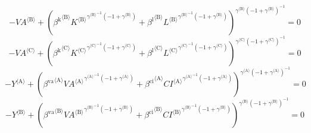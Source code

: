 \begin{equation}
-{{V\!A}}^{\langle \mathrm{B}\rangle} + \left({{\beta^{\mathrm{k}}}^{\langle \mathrm{\mathrm{B}}\rangle}} {{{K}^{\langle \mathrm{B}\rangle}}^{{{\gamma}^{\langle \mathrm{\mathrm{B}}\rangle}}^{-1} \left(-1 + {\gamma}^{\langle \mathrm{\mathrm{B}}\rangle}\right)}} + {{\beta^{\mathrm{l}}}^{\langle \mathrm{\mathrm{B}}\rangle}} {{{L}^{\langle \mathrm{B}\rangle}}^{{{\gamma}^{\langle \mathrm{\mathrm{B}}\rangle}}^{-1} \left(-1 + {\gamma}^{\langle \mathrm{\mathrm{B}}\rangle}\right)}}\right)^{{{\gamma}^{\langle \mathrm{\mathrm{B}}\rangle}} \left(-1 + {\gamma}^{\langle \mathrm{\mathrm{B}}\rangle}\right)^{-1}} = 0
\end{equation}
\begin{equation}
-{{V\!A}}^{\langle \mathrm{C}\rangle} + \left({{\beta^{\mathrm{k}}}^{\langle \mathrm{\mathrm{C}}\rangle}} {{{K}^{\langle \mathrm{C}\rangle}}^{{{\gamma}^{\langle \mathrm{\mathrm{C}}\rangle}}^{-1} \left(-1 + {\gamma}^{\langle \mathrm{\mathrm{C}}\rangle}\right)}} + {{\beta^{\mathrm{l}}}^{\langle \mathrm{\mathrm{C}}\rangle}} {{{L}^{\langle \mathrm{C}\rangle}}^{{{\gamma}^{\langle \mathrm{\mathrm{C}}\rangle}}^{-1} \left(-1 + {\gamma}^{\langle \mathrm{\mathrm{C}}\rangle}\right)}}\right)^{{{\gamma}^{\langle \mathrm{\mathrm{C}}\rangle}} \left(-1 + {\gamma}^{\langle \mathrm{\mathrm{C}}\rangle}\right)^{-1}} = 0
\end{equation}
\begin{equation}
-{Y}^{\langle \mathrm{A}\rangle} + \left({{\beta^{\mathrm{va}}}^{\langle \mathrm{\mathrm{A}}\rangle}} {{{{V\!A}}^{\langle \mathrm{A}\rangle}}^{{{\gamma}^{\langle \mathrm{\mathrm{A}}\rangle}}^{-1} \left(-1 + {\gamma}^{\langle \mathrm{\mathrm{A}}\rangle}\right)}} + {{\beta^{\mathrm{ci}}}^{\langle \mathrm{\mathrm{A}}\rangle}} {{{{C\!I}}^{\langle \mathrm{A}\rangle}}^{{{\gamma}^{\langle \mathrm{\mathrm{A}}\rangle}}^{-1} \left(-1 + {\gamma}^{\langle \mathrm{\mathrm{A}}\rangle}\right)}}\right)^{{{\gamma}^{\langle \mathrm{\mathrm{A}}\rangle}} \left(-1 + {\gamma}^{\langle \mathrm{\mathrm{A}}\rangle}\right)^{-1}} = 0
\end{equation}
\begin{equation}
-{Y}^{\langle \mathrm{B}\rangle} + \left({{\beta^{\mathrm{va}}}^{\langle \mathrm{\mathrm{B}}\rangle}} {{{{V\!A}}^{\langle \mathrm{B}\rangle}}^{{{\gamma}^{\langle \mathrm{\mathrm{B}}\rangle}}^{-1} \left(-1 + {\gamma}^{\langle \mathrm{\mathrm{B}}\rangle}\right)}} + {{\beta^{\mathrm{ci}}}^{\langle \mathrm{\mathrm{B}}\rangle}} {{{{C\!I}}^{\langle \mathrm{B}\rangle}}^{{{\gamma}^{\langle \mathrm{\mathrm{B}}\rangle}}^{-1} \left(-1 + {\gamma}^{\langle \mathrm{\mathrm{B}}\rangle}\right)}}\right)^{{{\gamma}^{\langle \mathrm{\mathrm{B}}\rangle}} \left(-1 + {\gamma}^{\langle \mathrm{\mathrm{B}}\rangle}\right)^{-1}} = 0
\end{equation}
